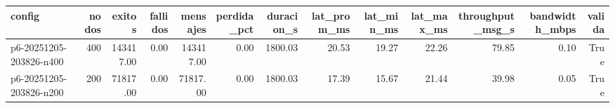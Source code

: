 \begin{tabular}{lrrrrrrrrrrrr}
\toprule
config & nodos & exitos & fallidos & mensajes & perdida_pct & duracion_s & lat_prom_ms & lat_min_ms & lat_max_ms & throughput_msg_s & bandwidth_mbps & valida \\
\midrule
p6-20251205-203826-n400 & 400 & 143417.00 & 0.00 & 143417.00 & 0.00 & 1800.03 & 20.53 & 19.27 & 22.26 & 79.85 & 0.10 & True \\
p6-20251205-203826-n200 & 200 & 71817.00 & 0.00 & 71817.00 & 0.00 & 1800.03 & 17.39 & 15.67 & 21.44 & 39.98 & 0.05 & True \\
\bottomrule
\end{tabular}
